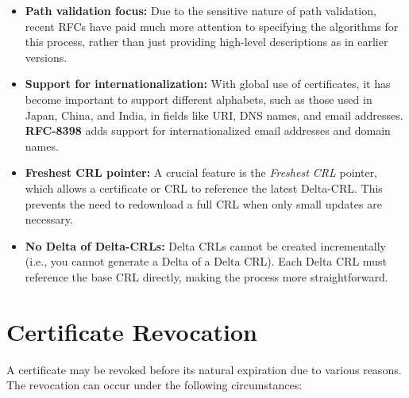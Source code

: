 \begin{itemize}
  \item \textbf{Path validation focus:} Due to the sensitive nature of 
    path validation, recent RFCs have paid much more attention to 
    specifying the algorithms for this process, rather than just 
    providing high-level descriptions as in earlier versions. 
  \item \textbf{Support for internationalization:} With global use of 
    certificates, it has become important to support different 
    alphabets, such as those used in Japan, China, and India, in 
    fields like URI, DNS names, and email addresses. \textbf{RFC-8398} 
    adds support for internationalized email addresses and domain 
    names.
  \item \textbf{Freshest CRL pointer:} A crucial feature is the 
    \emph{Freshest CRL} pointer, which allows a certificate or CRL to 
    reference the latest Delta-CRL. This prevents the need to 
    redownload a full CRL when only small updates are necessary.
  \item \textbf{No Delta of Delta-CRLs:} Delta CRLs cannot be created 
    incrementally (i.e., you cannot generate a Delta of a Delta CRL). 
    Each Delta CRL must reference the base CRL directly, making the 
    process more straightforward.
\end{itemize}

\section{Certificate Revocation}

A certificate may be revoked before its natural expiration due 
to various reasons. The revocation can occur under the following 
circumstances:


